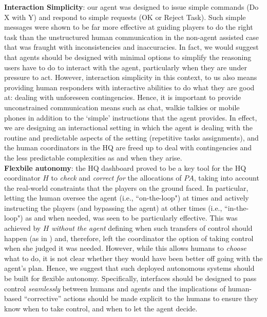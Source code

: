 \noindent \textbf{Interaction Simplicity}: our agent was designed to issue simple commands (Do X with Y) and respond to simple requests (OK or Reject Task). Such simple messages were shown to be far more effective at guiding players to do the right task than the unstructured human communication in the non-agent assisted case that was fraught with inconsistencies and inaccuracies. In fact, we would suggest that agents should be designed with minimal options to simplify the reasoning users have to do to interact with the agent, particularly when they are under pressure to act. However, interaction simplicity in this context, to us also means providing human responders with interactive abilities to do what they are good at: dealing with unforeseen contingencies. Hence, it is important to provide unconstrained communication means such as chat, walkie talkies or mobile phones in addition to the `simple' instructions that the agent provides. In effect, we are designing an interactional setting in which the agent is dealing with the routine and predictable aspects of the setting (repetitive tasks assignments), and the human coordinators in the HQ are freed up to deal with contingencies and the less predictable complexities as and when they arise.\\

\noindent \textbf{Flexbile autonomy}: the HQ dashboard proved to be a key tool for the HQ coordinator $H$ to \emph{check} and \emph{correct for} the allocations of $PA$, taking into account the real-world constraints that the players on the ground faced. In particular, letting the human oversee the agent (i.e., ``on-the-loop") at times and actively instructing  the players (and bypassing the agent) at other times (i.e., ``in-the-loop") as and when needed, was seen to be particularly effective. This was achieved by $H$ \emph{without the agent} defining when such transfers of control should happen (as in \cite{scerri:etal:2005}) and, therefore, left the coordinator the option of taking control when she judged it was needed. However, while this allows humans to \emph{choose} what to do, it is not clear whether they would have been better off going with the agent's plan. Hence, we suggest that such deployed autonomous systems should be built for flexible autonomy. Specifically, interfaces should be designed to pass control \emph{seamlessly} between humans and agents and the implications of human-based ``corrective'' actions  should be made explicit to the humans to ensure they know when to take control, and when to let the agent decide.


